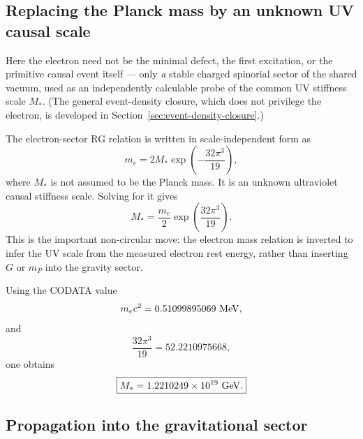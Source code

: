 \documentclass[11pt]{article}
\begin{document}
\subsection{Replacing the Planck mass by an unknown UV causal scale}

Here the electron need not be the minimal defect, the first excitation, or the primitive causal event itself --- only \emph{a} stable charged spinorial sector of the shared vacuum, used as an independently calculable probe of the common UV stiffness scale $M_*$. (The general event-density closure, which does not privilege the electron, is developed in Section~\ref{sec:event-density-closure}.)

The electron-sector RG relation is written in scale-independent form as
\begin{equation}
\boxed{m_e=2M_*\exp\left(-\frac{32\pi^3}{19}\right),}
\end{equation}
where $M_*$ is not assumed to be the Planck mass. It is an unknown ultraviolet causal stiffness scale. Solving for it gives
\begin{equation}
\boxed{M_*=\frac{m_e}{2}\exp\left(\frac{32\pi^3}{19}\right).}
\end{equation}
This is the important non-circular move: the electron mass relation is inverted to infer the UV scale from the measured electron rest energy, rather than inserting $G$ or $m_P$ into the gravity sector.

Using the CODATA value \cite{nist-electron-energy}
\begin{equation}
 m_e c^2=0.51099895069\ {\rm MeV},
\end{equation}
and
\begin{equation}
\frac{32\pi^3}{19}=52.2210975668,
\end{equation}
one obtains
\begin{equation}
\boxed{M_*=1.2210249\times10^{19}\ {\rm GeV}.}
\end{equation}

\subsection{Propagation into the gravitational sector}
\end{document}
